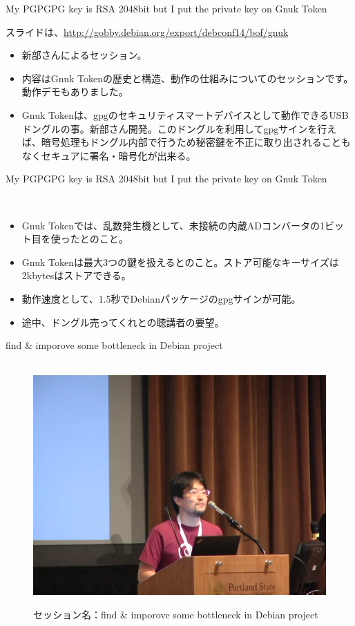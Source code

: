 \begin{frame}{My PGPGPG key is RSA 2048bit but I put the private key on Gnuk Token}

 スライドは、\url{http://gobby.debian.org/export/debconf14/bof/gnuk}

 \begin{itemize}
 \item 新部さんによるセッション。
 \item 内容はGnuk Tokenの歴史と構造、動作の仕組みについてのセッションです。動作デモもありました。
 \item Gnuk Tokenは、gpgのセキュリティスマートデバイスとして動作できるUSBドングルの事。新部さん開発。このドングルを利用してgpgサインを行えば、暗号処理もドングル内部で行うため秘密鍵を不正に取り出されることもなくセキュアに署名・暗号化が出来る。
　\end{itemize}

\end{frame}

\begin{frame}{My PGPGPG key is RSA 2048bit but I put the private key on Gnuk Token}

　\begin{itemize}
  \item Gnuk Tokenでは、乱数発生機として、未接続の内蔵ADコンバータの1ビット目を使ったとのこと。
  \item Gnuk Tokenは最大3つの鍵を扱えるとのこと。ストア可能なキーサイズは2kbytesはストアできる。
　\item 動作速度として、1.5秒でDebianパッケージのgpgサインが可能。
  \item  途中、ドングル売ってくれとの聴講者の要望。
  \end{itemize}

\end{frame}


\begin{frame}{find \& imporove some bottleneck in Debian project}

\begin{figure}[H]
\begin{center}
　\includegraphics[width=0.6\hsize]{image201409/find_improve.png}
\end{center}
\caption{セッション名：find \& imporove some bottleneck in Debian project}
\end{figure}

\end{frame}


